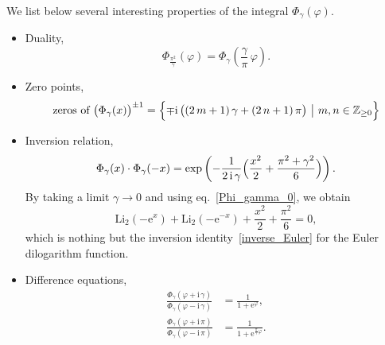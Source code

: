\documentclass[12pt]{article}
\numberwithin{equation}{section}
\newcommand{\Li}{\mathrm{Li}_2}
\begin{document}
We list below several interesting properties of the integral
$\Phi_\gamma(\varphi)$.
\begin{itemize}
\item Duality,
  \begin{equation}
    \Phi_{\frac{\pi^2}{\gamma}} ( \varphi)
    =
    \Phi_{\gamma}(\frac{\gamma}{\pi} \, \varphi) .
  \end{equation}

\item Zero points,
  \begin{equation}
    \text{zeros of $\bigl( \Phi_\gamma(x) \bigr)^{\pm 1}$}
    =
    \Bigl\{
    \mp \mathrm{i} \,
    \bigl(
    (2 \, m +1 ) \, \gamma +
    ( 2 \, n + 1 ) \, \pi
    \bigr)
    \ \big| \
    m, n \in \mathbb{Z}_{\geq 0}
    \Bigr\}
  \end{equation}

\item  Inversion relation,
  \begin{equation}
    \label{inversion_Phi}
    \Phi_\gamma(x) \cdot \Phi_\gamma( -x)
    =
    \exp
    \left(
      - \frac{1}{2 \, \mathrm{i} \, \gamma}
      \Bigl(
      \frac{x^2}{2} + \frac{\pi^2 + \gamma^2}{6}
      \Bigr)
    \right) .
  \end{equation}
  By taking a limit $\gamma \to 0$ and using eq.~\eqref{Phi_gamma_0},
  we obtain
  \begin{equation*}
    \Li(- \mathrm{e}^x) + \Li(-\mathrm{e}^{-x})
    +
    \frac{x^2}{2} + \frac{\pi^2}{6} = 0 ,
  \end{equation*}
  which is nothing but
  the inversion identity~\eqref{inverse_Euler}  for the Euler
  dilogarithm function.


\item Difference equations,
  \begin{subequations}
    \begin{align}
      \frac{\Phi_\gamma(\varphi + \mathrm{i} \, \gamma)}
      {    \Phi_\gamma(\varphi - \mathrm{i} \, \gamma)}
      & =
      \frac{1}{1 + \mathrm{e}^\varphi}         ,
      \\[2mm]
%
      \frac{ \Phi_\gamma(\varphi + \mathrm{i} \, \pi)}{
        \Phi_\gamma(\varphi - \mathrm{i} \, \pi)}
      & =
      \frac{1}{1 + \mathrm{e}^{\frac{\pi}{\gamma}\varphi}} .
    \end{align}
    

\end{subequations}
\end{itemize}
\end{document}
